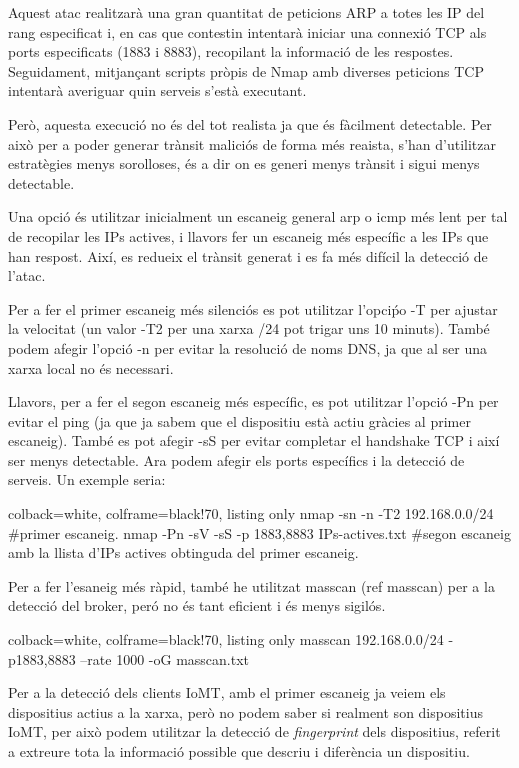 Aquest atac realitzarà una gran quantitat de peticions ARP a totes les IP del rang especificat i, en cas que contestin intentarà iniciar una connexió TCP als ports especificats (1883 i 8883), recopilant la informació de les respostes. Seguidament, mitjançant scripts pròpis de Nmap amb diverses peticions TCP intentarà averiguar quin serveis s'està executant.  

Però, aquesta execució no és del tot realista ja que és fàcilment detectable. Per això per a poder generar trànsit maliciós de forma més reaista, s'han d'utilitzar estratègies menys sorolloses, és a dir on es generi menys trànsit i sigui menys detectable.

Una opció és utilitzar inicialment un escaneig general arp o icmp més lent per tal de recopilar les IPs actives, i llavors fer un escaneig més específic a les IPs que han respost. Així, es redueix el trànsit generat i es fa més difícil la detecció de l'atac.

Per a fer el primer escaneig més silenciós es pot utilitzar l'opciṕo -T per ajustar la velocitat (un valor -T2 per una xarxa /24 pot trigar uns 10 minuts). També podem afegir l'opció -n per evitar la resolució de noms DNS, ja que al ser una xarxa local no és necessari. 

Llavors, per a fer el segon escaneig més específic, es pot utilitzar l'opció -Pn per evitar el ping (ja que ja sabem que el dispositiu està actiu gràcies al primer escaneig). També es pot afegir -sS per evitar completar el handshake TCP i així ser menys detectable. Ara podem afegir els ports específics i la detecció de serveis. Un exemple seria: 
\begin{tcblisting}{colback=white, colframe=black!70, listing only}
    nmap -sn -n -T2 192.168.0.0/24   #primer escaneig.
    nmap -Pn -sV -sS -p 1883,8883 IPs-actives.txt  #segon escaneig amb la llista d'IPs actives obtinguda del primer escaneig.
\end{tcblisting}

Per a fer l'esaneig més ràpid, també he utilitzat masscan (ref masscan) per a la detecció del broker, peró no és tant eficient i és menys sigilós. 

\begin{tcblisting}{colback=white, colframe=black!70, listing only}
    masscan 192.168.0.0/24 -p1883,8883 --rate 1000 -oG masscan.txt
\end{tcblisting}

Per a la detecció dels clients IoMT, amb el primer escaneig ja veiem els dispositius actius a la xarxa, però no podem saber si realment son dispositius IoMT, per això podem utilitzar la detecció de \textit{fingerprint} dels dispositius, referit a extreure tota la informació possible que descriu i diferència un dispositiu. 

